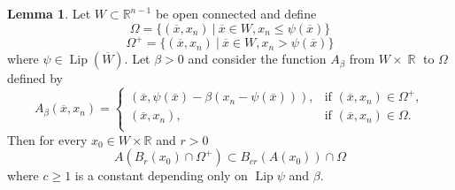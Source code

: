 \documentclass[12pt]{article}
\theoremstyle{definition}
\newtheorem{lemma}{Lemma}
\DeclareMathOperator\Lip{Lip}
\DeclareMathOperator\rr{\mathbb{R}}
\begin{document}
\begin{lemma}\label{lcircle}
Let $W \subset \mathbb{R}^{n-1}$ be open connected and define
\[\Omega =\{ (\overline x,x_n) \ |\ \overline x\in W, x_n\le \psi(\overline x)  \} \]
\[\Omega^+ =\{ (\overline x,x_n) \ |\ \overline x\in W, x_n> \psi(\overline x)  \} \]
where $\psi \in \Lip(\overline W)$. Let $\beta>0$ and consider the function $A_\beta$ from $W \times \rr$ to $\Omega$ defined by
\[ A_\beta(\overline x, x_n) =\begin{cases}
							(\overline x , \psi(\overline x)-\beta(x_n-\psi(\overline x))), & \text{if } (\overline x, x_n) \in \Omega^+ ,\\
							(\overline x, x_n), & \text{if } (\overline x, x_n) \in \Omega .\\
\end{cases}
\]
 Then for every $x_0 \in W \times \mathbb{R}$ and $r>0$
\[ A(B_r(x_0)\cap \Omega^+)\subset B_{cr}(A(x_0))\cap \Omega\]
where $c\ge 1$ is a constant depending only on $\Lip \psi$ and $\beta$.
\end{lemma}
\end{document}
